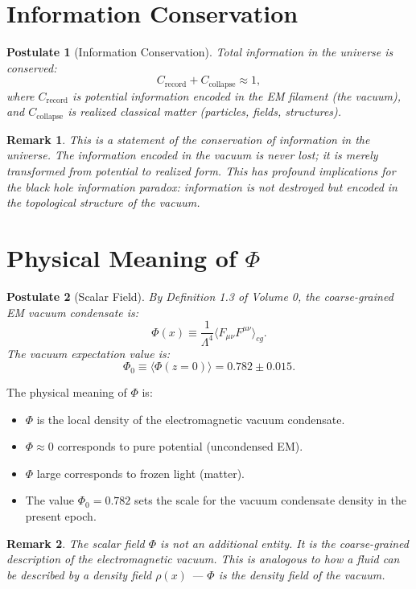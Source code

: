 \documentclass[12pt,oneside]{book}
\newtheorem{postulate}{Postulate}[chapter]
\newtheorem{remark}{Remark}[chapter]
\begin{document}
\section{Information Conservation}

\begin{postulate}[Information Conservation]
Total information in the universe is conserved:
\[
C_{\text{record}} + C_{\text{collapse}} \approx 1,
\]
where $C_{\text{record}}$ is potential information encoded in the EM filament (the vacuum), and $C_{\text{collapse}}$ is realized classical matter (particles, fields, structures).
\end{postulate}

\begin{remark}
This is a statement of the conservation of information in the universe. The information encoded in the vacuum is never lost; it is merely transformed from potential to realized form. This has profound implications for the black hole information paradox: information is not destroyed but encoded in the topological structure of the vacuum.
\end{remark}

\section{Physical Meaning of $\Phi$}

\begin{postulate}[Scalar Field]
By Definition 1.3 of Volume 0, the coarse-grained EM vacuum condensate is:
\[
\Phi(x) \equiv \frac{1}{\Lambda^4} \langle F_{\mu\nu} F^{\mu\nu} \rangle_{cg}.
\]
The vacuum expectation value is:
\[
\Phi_0 \equiv \langle \Phi(z=0) \rangle = 0.782 \pm 0.015.
\]
\end{postulate}

The physical meaning of $\Phi$ is:
\begin{itemize}
    \item $\Phi$ is the local density of the electromagnetic vacuum condensate.
    \item $\Phi \approx 0$ corresponds to pure potential (uncondensed EM).
    \item $\Phi$ large corresponds to frozen light (matter).
    \item The value $\Phi_0 = 0.782$ sets the scale for the vacuum condensate density in the present epoch.
\end{itemize}

\begin{remark}
The scalar field $\Phi$ is not an additional entity. It is the coarse-grained description of the electromagnetic vacuum. This is analogous to how a fluid can be described by a density field $\rho(x)$ — $\Phi$ is the density field of the vacuum.
\end{remark}
\end{document}
